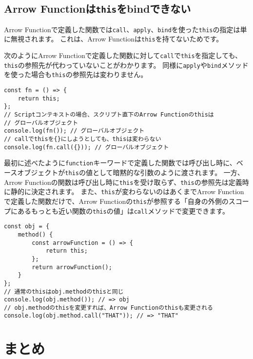 \hypertarget{not-bind-arrow-function}{%
\subsection{\texorpdfstring{Arrow
Functionは\texttt{this}をbindできない}{Arrow Functionはthisをbindできない}}\label{not-bind-arrow-function}}

Arrow
Functionで定義した関数では\texttt{call}、\texttt{apply}、\texttt{bind}を使った\texttt{this}の指定は単に無視されます。
これは、Arrow
Functionは\texttt{this}を持てないためです。

次のようにArrow
Functionで定義した関数に対して\texttt{call}で\texttt{this}を指定しても、\texttt{this}の参照先が代わっていないことがわかります。
同様に\texttt{apply}や\texttt{bind}メソッドを使った場合も\texttt{this}の参照先は変わりません。

\begin{lstlisting}
const fn = () => {
    return this;
};
// Scriptコンテキストの場合、スクリプト直下のArrow Functionのthisは
// グローバルオブジェクト
console.log(fn()); // グローバルオブジェクト
// callでthisを{}にしようとしても、thisは変わらない
console.log(fn.call({})); // グローバルオブジェクト
\end{lstlisting}

最初に述べたように\texttt{function}キーワードで定義した関数では呼び出し時に、ベースオブジェクトが\texttt{this}の値として暗黙的な引数のように渡されます。
一方、Arrow
Functionの関数は呼び出し時に\texttt{this}を受け取らず、\texttt{this}の参照先は定義時に静的に決定されます。
\newpage
また、\texttt{this}が変わらないのはあくまでArrow
Functionで定義した関数だけで、Arrow
Functionの\texttt{this}が参照する「自身の外側のスコープにあるもっとも近い関数の\texttt{this}の値」は\texttt{call}メソッドで変更できます。

\begin{lstlisting}
const obj = {
    method() {
        const arrowFunction = () => {
            return this;
        };
        return arrowFunction();
    }
};
// 通常のthisはobj.methodのthisと同じ
console.log(obj.method()); // => obj
// obj.methodのthisを変更すれば、Arrow Functionのthisも変更される
console.log(obj.method.call("THAT")); // => "THAT"
\end{lstlisting}

\hypertarget{conclusion}{%
\section{まとめ}\label{conclusion}}

